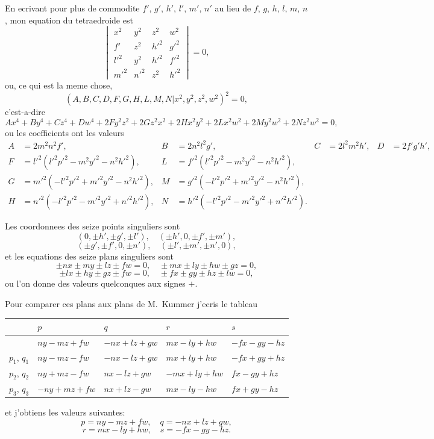 \documentclass[11pt,a4paper]{article}
\theoremstyle{plain}
\begin{document}
En ecrivant pour plus de commodite $f'$, $g'$, $h'$, $l'$, $m'$, $n'$ au lieu de $f$, $g$, $h$, $l$, $m$, $n$, mon equation du tetraedroide est
\[
\begin{vmatrix}
x^2 & y^2 & z^2 & w^2 \\
f' & z^2 & h'^2 & g'^2 \\
l'^2 & y^2 & h'^2 & f'^2 \\
m'^2 & n'^2 & z^2 & h'^2
\end{vmatrix} = 0,
\]
ou, ce qui est la meme chose,
\[
(A, B, C, D, F, G, H, L, M, N | x^2, y^2, z^2, w^2)^2 = 0,
\]
c'est-a-dire
\[
Ax^4 + By^4 + Cz^4 + Dw^4 + 2Fy^2z^2 + 2Gz^2x^2 + 2Hx^2y^2 + 2Lx^2w^2 + 2My^2w^2 + 2Nz^2w^2 = 0,
\]
ou les coefficients ont les valeurs
\begin{align*}
A &= 2m^2n^2f', & B &= 2n^2l^2g', & C &= 2l^2m^2h', & D &= 2f'g'h', \\
F &= l'^2(l'^2p'^2 - m^2y'^2 - n^2h'^2), & L &= f'^2(l'^2p'^2 - m^2y'^2 - n^2h'^2), \\
G &= m'^2(-l'^2p'^2 + m'^2y'^2 - n^2h'^2), & M &= g'^2(-l'^2p'^2 + m'^2y'^2 - n^2h'^2), \\
H &= n'^2(-l'^2p'^2 - m'^2y'^2 + n'^2h'^2), & N &= h'^2(-l'^2p'^2 - m'^2y'^2 + n'^2h'^2).
\end{align*}

Les coordonnees des seize points singuliers sont
\[
(0, \pm h', \pm g', \pm l'), \quad (\pm h', 0, \pm f', \pm m'),
\]
\[
(\pm g', \pm f', 0, \pm n'), \quad (\pm l', \pm m', \pm n', 0),
\]
et les equations des seize plans singuliers sont
\[
\pm nx \pm my \pm lz \pm fw = 0, \quad \pm mx \pm ly \pm hw \pm gz = 0,
\]
\[
\pm lx \pm hy \pm gz \pm fw = 0, \quad \pm fx \pm gy \pm hz \pm lw = 0,
\]
ou l'on donne des valeurs quelconques aux signes $+$.

Pour comparer ces plans aux plans de M.~Kummer j'ecris le tableau
\begin{center}
\begin{tabular}{l|llll}
& $p$ & $q$ & $r$ & $s$ \\
\hline
& $ny-mz+fw$ & $-nx+lz+gw$ & $mx-ly+hw$ & $-fx-gy-hz$ \\
$p_1$, $q_1$ & $ny-mz-fw$ & $-nx-lz+gw$ & $mx+ly+hw$ & $-fx+gy+hz$ \\
$p_2$, $q_2$ & $ny+mz-fw$ & $nx-lz+gw$ & $-mx+ly+hw$ & $fx-gy+hz$ \\
$p_3$, $q_3$ & $-ny+mz+fw$ & $nx+lz-gw$ & $mx-ly-hw$ & $fx+gy-hz$
\end{tabular}
\end{center}
et j'obtiens les valeurs suivantes:
\[
p = ny-mz+fw, \quad q = -nx+lz+gw,
\]
\[
r = mx-ly+hw, \quad s = -fx-gy-hz.
\]
\end{document}
